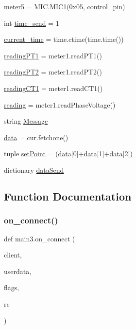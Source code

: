 \begin{DoxyCompactItemize}
\item 
\hyperlink{namespacemain3_aeda58cee300f9fae14d6fc3ca9891847}{meter5} = M\+I\+C.\+M\+I\+C1(0x05, control\+\_\+pin)
\item 
int \hyperlink{namespacemain3_aefc1f762f0a9b87f47694cb1310cd460}{time\+\_\+send} = 1
\item 
\hyperlink{namespacemain3_aa03fad60889e4cdf61e6898d8ef9617e}{current\+\_\+time} = time.\+ctime(time.\+time())
\item 
\hyperlink{namespacemain3_a66971b3af77d619b5249162539add371}{reading\+P\+T1} = meter1.\+read\+P\+T1()
\item 
\hyperlink{namespacemain3_a77f2179ee84347784f243bf150c0e373}{reading\+P\+T2} = meter1.\+read\+P\+T2()
\item 
\hyperlink{namespacemain3_ad4596b47de04ad652b165f8a319cc003}{reading\+C\+T1} = meter1.\+read\+C\+T1()
\item 
\hyperlink{namespacemain3_a34f71711d9f071c11a4574c8d3cef88d}{reading} = meter1.\+read\+Phase\+Voltage()
\item 
string \hyperlink{namespacemain3_a43f4efe6baf7e0cc4db121fab5cb163b}{Message}
\item 
\hyperlink{namespacemain3_af3b593054c807ee934bbbca0f4964a15}{data} = cur.\+fetchone()
\item 
tuple \hyperlink{namespacemain3_a248f67a00d1a70af3906de327bd341e2}{set\+Point} = (\hyperlink{namespacemain3_af3b593054c807ee934bbbca0f4964a15}{data}\mbox{[}0\mbox{]}+\hyperlink{namespacemain3_af3b593054c807ee934bbbca0f4964a15}{data}\mbox{[}1\mbox{]}+\hyperlink{namespacemain3_af3b593054c807ee934bbbca0f4964a15}{data}\mbox{[}2\mbox{]})
\item 
dictionary \hyperlink{namespacemain3_a5c3879d90e71304ff78e672fe925e10a}{data\+Send}
\end{DoxyCompactItemize}


\subsection{Function Documentation}
\mbox{\label{namespacemain3_a5c75165294c699dccf20a3a5105d1c83}} 
\subsubsection{\texorpdfstring{on\+\_\+connect()}{on\_connect()}}
{\footnotesize\ttfamily def main3.\+on\+\_\+connect (\begin{DoxyParamCaption}\item[{}]{client,  }\item[{}]{userdata,  }\item[{}]{flags,  }\item[{}]{rc }\end{DoxyParamCaption})}



